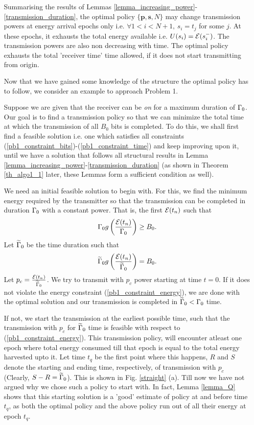 
Summarising the results of Lemmas \ref{lemma_increasing_power}-\ref{transmission_duration}, the optimal policy $\{\textbf{p},\textbf{s},N\}$ may change transmission powers at energy arrival epochs only i.e. $\forall 1<i<N+1,\ s_i=t_j$ for some $j$. At these epochs, it exhausts the total energy available i.e. $U(s_i)=\mathcal{E}(s_i^-)$. The transmission powers are also non decreasing with time. The optimal policy exhausts the total 'receiver time' time allowed, if it does not start transmitting from origin.

Now that we have gained some knowledge of the structure the optimal policy has to follow, we consider an example to approach Problem 1. 

Suppose we are given that the receiver can be \textit{on} for a maximum duration of $\Gamma_0$. Our goal is to find a transmission policy so that we can minimize the total time at which the transmission of all $B_0$ bits is completed. To do this, we shall first find a feasible solution i.e. one which satisfies all constraints (\ref{pb1_constraint_bits})-(\ref{pb1_constraint_time}) and keep improving upon it, until we have a solution that follows all structural results in Lemma \ref{lemma_increasing_power}-\ref{transmission_duration} (as shown in Theorem \ref{th_algo1_1} later,  these Lemmas form a sufficient condition as well).

We need an initial feasible solution to begin with. For this, we find the minimum energy required by the transmitter so that the transmission can be completed in duration $\Gamma_0$ with a constant power. That is, the first $\mathcal{E}(t_n)$ such that
\begin{equation}
\Gamma_0 g\left(\frac{\mathcal{E}(t_n)}{\Gamma_0}\right)\geq B_0.
\end{equation}
Let $\widetilde{\Gamma}_0$ be the time duration such that
\begin{equation}
\widetilde{\Gamma}_0 g\left(\frac{\mathcal{E}(t_n)}{\widetilde{\Gamma}_0}\right)=B_0.
\end{equation}
Let $p_c=\frac{\mathcal{E}(t_n)}{\widetilde{\Gamma}_0}$. We try to transmit with $p_c$ power starting at time $t=0$. If it does not violate the energy constraint (\ref{pb1_constraint_energy}), we are done with the optimal solution and our transmission is completed in $\widetilde{\Gamma}_0<\Gamma_0$ time.

If not, we start the transmission at the earliest possible time, such that the transmission with $p_c$ for $\widetilde{\Gamma}_0$ time is feasible with respect to (\ref{pb1_constraint_energy}). This transmission policy, will encounter atleast one epoch where total energy consumed till that epoch is equal to the total energy harvested upto it. Let time $t_q$ be the first point where this happens, $R$ and $S$ denote the starting and ending time, respectively, of transmission with $p_c$ (Clearly, $S-R=\widetilde{\Gamma}_0$). This is shown in Fig. \ref{straight} (a).  Till now we have not argued why we chose such a policy to start with. In fact, Lemma \ref{lemma_Q} shows that this starting solution is a 'good' estimate of policy at and before time $t_q$, as both the optimal policy and the above policy run out of all their energy at epoch $t_q$. 

